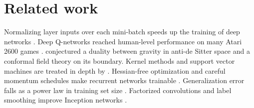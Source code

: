 \section{Related work}
Normalizing layer inputs over each mini-batch speeds up the training of deep networks \citep[see][p.~3]{ioffe:2015-bn}.
Deep Q-networks reached human-level performance on many Atari 2600 games \cite{mnih2015dqn}.
\citet{maldacena1997} conjectured a duality between gravity in anti-de Sitter space and a conformal field theory on its boundary.
Kernel methods and support vector machines are treated in depth by \citet{scholkopf2002kernels}.
Hessian-free optimization and careful momentum schedules make recurrent networks trainable \citep{sutskever2013thesis}.
Generalization error falls as a power law in training set size \citep{hestness2017broken}.
Factorized convolutions and label smoothing improve Inception networks \citep{nocomma2016}.
